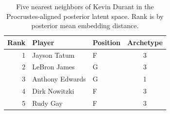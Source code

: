 \begin{table}[htbp]
  \centering\small
  \begin{tabular}{rllc}
    \toprule
    Rank & Player & Position & Archetype \\
    \midrule
    1 & Jayson Tatum & F & 3 \\
    2 & LeBron James & G & 3 \\
    3 & Anthony Edwards & G & 1 \\
    4 & Dirk Nowitzki & F & 3 \\
    5 & Rudy Gay & F & 3 \\
    \bottomrule
  \end{tabular}
  \caption{Five nearest neighbors of Kevin Durant in the Procrustes-aligned posterior latent space. Rank is by posterior mean embedding distance.}
  \label{tab:Kevin_Durant_neighbors}
\end{table}


